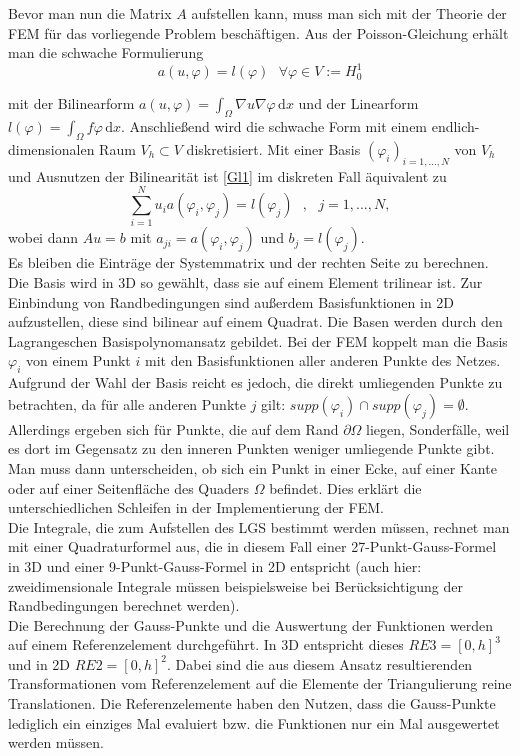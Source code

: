 Bevor man nun die Matrix $A$ aufstellen kann, muss man sich mit der Theorie der FEM für das vorliegende Problem beschäftigen. 
Aus der Poisson-Gleichung erhält man die schwache Formulierung 
\begin{equation}
a(u, \varphi)=l( \varphi) \text{ } \forall \varphi \in V:=H^1_0 
\end{equation} \label{Gl1}


mit der Bilinearform $a(u, \varphi)=\int_\Omega \! \nabla u \nabla \varphi \, \mathrm{d}x $ und der Linearform $l( \varphi)= \int_\Omega \! f \varphi \, \mathrm{d}x $. Anschließend wird die schwache Form mit einem endlich-dimensionalen Raum $V_h \subset V$ diskretisiert. Mit einer Basis $(\varphi_i)_{i=1,...,N}$ von $V_h$ und Ausnutzen der Bilinearität ist \eqref{Gl1} im diskreten Fall äquivalent zu 
\begin{equation}
\sum_{i=1}^N u_i a(\varphi_i, \varphi_j)=l(\varphi_j) \text{ } , \text{ } j = 1,...,N,
\end{equation}
wobei dann $A u = b$ mit $a_{ji}=a(\varphi_i, \varphi_j)$ und $b_j=l(\varphi_j)$. \\

Es bleiben die Einträge der Systemmatrix und der rechten Seite zu berechnen. 
Die Basis  wird in 3D so gewählt, dass sie auf einem Element trilinear ist. Zur Einbindung von Randbedingungen sind außerdem Basisfunktionen in 2D aufzustellen, diese sind bilinear auf einem Quadrat. Die Basen werden durch den Lagrangeschen Basispolynomansatz gebildet. Bei der FEM koppelt man die Basis $\varphi_i$ von einem Punkt $i$ mit den Basisfunktionen aller anderen Punkte des Netzes. Aufgrund der Wahl der Basis reicht es jedoch, die direkt umliegenden Punkte zu betrachten, da für alle anderen Punkte $j$ gilt: $supp(\varphi_i) \cap supp(\varphi_j) = \emptyset$. Allerdings ergeben sich für Punkte, die auf dem Rand $\partial \Omega$ liegen, Sonderfälle, weil es dort im Gegensatz zu den inneren Punkten weniger umliegende Punkte gibt. Man muss dann unterscheiden, ob sich ein Punkt in einer Ecke, auf einer Kante oder auf einer Seitenfläche des Quaders $\Omega$ befindet. Dies erklärt die unterschiedlichen Schleifen in der Implementierung der FEM. \\
Die Integrale, die zum Aufstellen des LGS bestimmt werden müssen, rechnet man mit einer Quadraturformel aus, die in diesem Fall einer 27-Punkt-Gauss-Formel in 3D und einer 9-Punkt-Gauss-Formel in 2D entspricht (auch hier: zweidimensionale Integrale müssen beispielsweise bei Berücksichtigung der Randbedingungen berechnet werden). \\
Die Berechnung der Gauss-Punkte und die Auswertung der Funktionen werden auf einem Referenzelement durchgeführt. In 3D entspricht dieses $RE3=[0,h]^3$ und in 2D $RE2=[0,h]^2$. Dabei sind die aus diesem Ansatz resultierenden Transformationen vom Referenzelement auf die Elemente der Triangulierung reine Translationen. Die Referenz\-elemente haben den Nutzen, dass die Gauss-Punkte lediglich ein einziges Mal evaluiert bzw. die Funktionen nur ein Mal ausgewertet werden müssen.   \\


